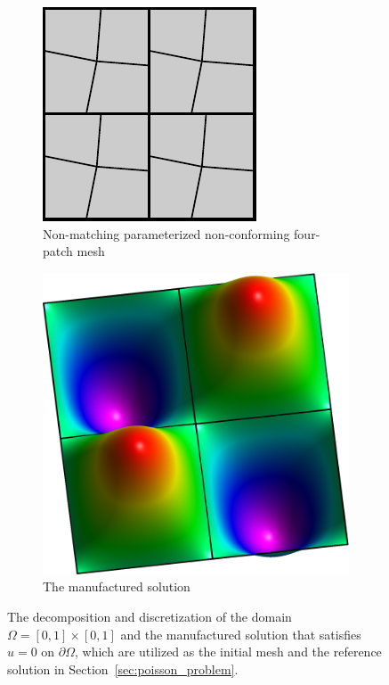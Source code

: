 \begin{figure}[ht]
	\center
	\begin{subfigure}[t]{.45\linewidth}
		\center
		\includegraphics[scale=1.35]{four_patches_nonconform_nonmatch}
		\caption{Non-matching parameterized non-conforming four-patch mesh}\label{fig:Poisson_mesh}
	\end{subfigure}
	\begin{subfigure}[t]{.45\linewidth}
		\center
		\includegraphics[scale=.41]{four_patches_solution-plot}
		\caption{The manufactured solution}\label{fig:Poisson_manufacture}
	\end{subfigure}
	\caption{The decomposition and discretization of the domain $\Omega=\left[ 0, 1\right]\times \left[ 0, 1\right]$ and the manufactured solution that satisfies $u=0$ on $\partial\Omega$, which are utilized as the initial mesh and the reference solution in Section~\ref{sec:poisson_problem}.}
\end{figure}

